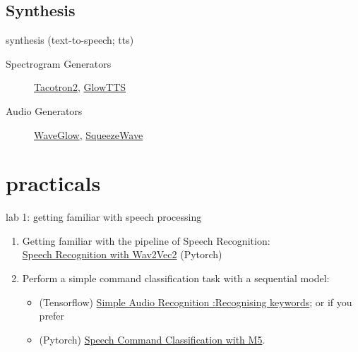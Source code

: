 \documentclass[aspectratio=169,xcolor={dvipsnames,svgnames}]{beamer}
\begin{document}
\subsection{Synthesis}
\label{sec:orgb6dd743}
\begin{frame}[label=schedule-synthesis]{synthesis (text-to-speech; tts)}
\begin{description}
\item[{Spectrogram Generators}] \href{https://paperswithcode.com/paper/natural-tts-synthesis-by-conditioning-wavenet}{Tacotron2}, \href{https://paperswithcode.com/paper/glow-tts-a-generative-flow-for-text-to-speech}{GlowTTS}
\item[{Audio Generators}] \href{https://paperswithcode.com/paper/waveglow-a-flow-based-generative-network-for}{WaveGlow}, \href{https://cs.paperswithcode.com/paper/squeezewave-extremely-lightweight-vocoders}{SqueezeWave}
\end{description}
\end{frame}

\section{practicals}
\label{schedule-of-practicals}
\begin{frame}[label=lab-1]{lab 1: getting familiar with speech processing}
\begin{enumerate}
\item Getting familiar with the pipeline of Speech
Recognition: \\[0pt]
\href{https://pytorch.org/audio/stable/tutorials/speech\_recognition\_pipeline\_tutorial.html}{Speech Recognition with Wav2Vec2} (Pytorch)
\item Perform a simple command classification task with
a sequential model:
\begin{itemize}
\item (Tensorflow) \href{https://www.tensorflow.org/tutorials/audio/simple\_audio}{Simple Audio Recognition :Recognising
keywords}; or if you prefer
\item (Pytorch) \href{https://pytorch.org/tutorials/intermediate/speech\_command\_classification\_with\_torchaudio\_tutorial.html}{Speech Command Classification with M5}.
\end{itemize}
\end{enumerate}
\end{frame}
\end{document}

